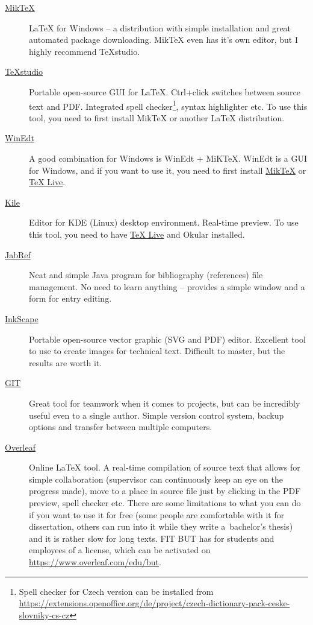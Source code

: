 \begin{description}
	\item[\href{http://miktex.org/download}{MikTeX}] \LaTeX{} for Windows -- a distribution with simple installation and great automated package downloading. MikTeX even has it's own editor, but I highly recommend TeXstudio.
	\item[\href{http://texstudio.sourceforge.net/}{TeXstudio}] Portable open-source GUI for \LaTeX{}. Ctrl+click switches between source text and PDF. Integrated spell checker\footnote{Spell checker for Czech version can be installed from \url{https://extensions.openoffice.org/de/project/czech-dictionary-pack-ceske-slovniky-cs-cz}}, syntax highlighter etc. To use this tool, you need to first install MikTeX or another \LaTeX{} distribution.
    \item[\href{http://www.winedt.com/}{WinEdt}] A good combination for Windows is WinEdt + MiKTeX. WinEdt is a GUI for Windows, and if you want to use it, you need to first install \href{http://miktex.org/download}{MikTeX} or \href{http://www.tug.org/texlive/}{TeX Live}.
    \item[\href{http://kile.sourceforge.net/}{Kile}] Editor for KDE (Linux) desktop environment. Real-time preview. To use this tool, you need to have \href{http://www.tug.org/texlive/}{TeX Live} and Okular installed.
	\item[\href{http://jabref.sourceforge.net/download.php}{JabRef}] Neat and simple Java program for bibliography (references) file management. No need to learn anything -- provides a simple window and a form for entry editing.
	\item[\href{https://inkscape.org/en/download/}{InkScape}] Portable open-source vector graphic (SVG and PDF) editor. Excellent tool to use to create images for technical text. Difficult to master, but the results are worth it.
	\item[\href{https://git-scm.com/}{GIT}] Great tool for teamwork when it comes to projects, but can be incredibly useful even to a single author. Simple version control system, backup options and transfer between multiple computers.
	\item[\href{http://www.overleaf.com/}{Overleaf}] Online \LaTeX{} tool. A real-time compilation of source text that allows for simple collaboration (supervisor can continuously keep an eye on the progress made), move to a place in source file just by clicking in the PDF preview, spell checker etc. There are some limitations to what you can do if you want to use it for free (some people are comfortable with it for dissertation, others can run into it while they write a~bachelor's thesis) and it is rather slow for long texts. FIT BUT has for students and employees of a license, which can be activated on \url{https://www.overleaf.com/edu/but}.
\end{description}

